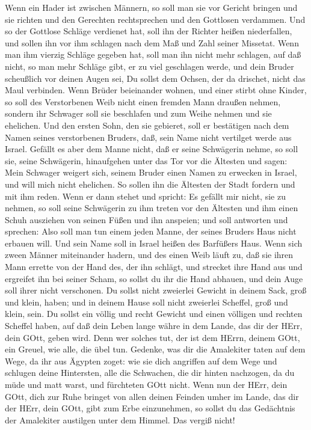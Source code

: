 Wenn ein Hader ist zwischen Männern, so soll man sie vor
Gericht bringen und sie richten und den Gerechten rechtsprechen und den
Gottlosen verdammen.  Und so der Gottlose Schläge verdienet
hat, soll ihn der Richter heißen niederfallen, und sollen ihn vor ihm
schlagen nach dem Maß und Zahl seiner Missetat.  Wenn man
ihm vierzig Schläge gegeben hat, soll man ihn nicht mehr schlagen, auf
daß nicht, so man mehr Schläge gibt, er zu viel geschlagen werde, und
dein Bruder scheußlich vor deinen Augen sei,  Du sollst dem
Ochsen, der da drischet, nicht das Maul verbinden.  Wenn
Brüder beieinander wohnen, und einer stirbt ohne Kinder, so soll des
Verstorbenen Weib nicht einen fremden Mann draußen nehmen, sondern ihr
Schwager soll sie beschlafen und zum Weihe nehmen und sie ehelichen.
 Und den ersten Sohn, den sie gebieret, soll er bestätigen
nach dem Namen seines verstorbenen Bruders, daß, sein Name nicht
vertilget werde aus Israel.  Gefällt es aber dem Manne
nicht, daß er seine Schwägerin nehme, so soll sie, seine Schwägerin,
hinaufgehen unter das Tor vor die Ältesten und sagen: Mein Schwager
weigert sich, seinem Bruder einen Namen zu erwecken in Israel, und will
mich nicht ehelichen.  So sollen ihn die Ältesten der Stadt
fordern und mit ihm reden. Wenn er dann stehet und spricht: Es gefällt
mir nicht, sie zu nehmen,  so soll seine Schwägerin zu ihm
treten vor den Ältesten und ihm einen Schuh ausziehen von seinen Füßen
und ihn anspeien; und soll antworten und sprechen: Also soll man tun
einem jeden Manne, der seines Bruders Haus nicht erbauen will.
 Und sein Name soll in Israel heißen des Barfüßers Haus.
 Wenn sich zween Männer miteinander hadern, und des einen
Weib läuft zu, daß sie ihren Mann errette von der Hand des, der ihn
schlägt, und strecket ihre Hand aus und ergreifet ihn bei seiner Scham,
 so sollst du ihr die Hand abhauen, und dein Auge soll
ihrer nicht verschonen.  Du sollst nicht zweierlei Gewicht
in deinem Sack, groß und klein, haben;  und in deinem Hause
soll nicht zweierlei Scheffel, groß und klein, sein.  Du
sollst ein völlig und recht Gewicht und einen völligen und rechten
Scheffel haben, auf daß dein Leben lange währe in dem Lande, das dir der
HErr, dein GOtt, geben wird.  Denn wer solches tut, der ist
dem HErrn, deinem GOtt, ein Greuel, wie alle, die übel tun.
 Gedenke, was dir die Amalekiter taten auf dem Wege, da ihr
aus Ägypten zoget:  wie sie dich angriffen auf dem Wege und
schlugen deine Hintersten, alle die Schwachen, die dir hinten nachzogen,
da du müde und matt warst, und fürchteten GOtt nicht.  Wenn
nun der HErr, dein GOtt, dich zur Ruhe bringet von allen deinen Feinden
umher im Lande, das dir der HErr, dein GOtt, gibt zum Erbe einzunehmen,
so sollst du das Gedächtnis der Amalekiter austilgen unter dem Himmel.
Das vergiß nicht!

